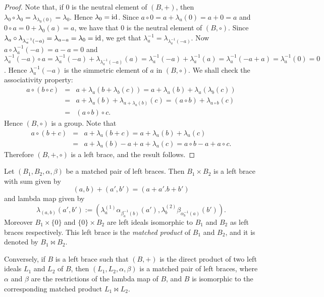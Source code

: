 \begin{proof}
	Note that, if $0$ is the neutral element of $(B,+)$, then $\lambda_0\circ\lambda_0=\lambda_{\lambda_0(0)}=\lambda_0$. Hence
	$\lambda_0=\operatorname{id}$. Since $a\circ 0=a+\lambda_a(0)=a+0=a$ and $0\circ a=0+\lambda_0(a)=a$, we have that $0$ is the neutral element of $(B,\circ)$. Since $\lambda_a\circ\lambda_{\lambda^{-1}_{a}(-a)}=\lambda_{a-a}=\lambda_0=\operatorname{id}$, we get that $\lambda^{-1}_a=\lambda_{\lambda^{-1}_a(-a)}$. Now $a\circ \lambda^{-1}_{a}(-a)=a-a=0$ and $\lambda^{-1}_a(-a)\circ a=\lambda^{-1}_a(-a)+\lambda_{\lambda^{-1}_a(-a)}(a)=\lambda^{-1}_a(-a)+\lambda^{-1}_{a}(a)=\lambda^{-1}_a(-a+a)=\lambda^{-1}_a(0)=0$. Hence $\lambda^{-1}_a(-a)$ is the simmetric element of $a$ in $(B,\circ)$. We shall check the associativity property:
	\begin{eqnarray*}
		a\circ (b\circ c)&=&a+\lambda_a(b+\lambda_b(c))=a+\lambda_a(b)+\lambda_a(\lambda_b(c))\\
		&=&a+\lambda_a(b)+\lambda_{a+\lambda_a(b)}(c)=(a\circ b)+\lambda_{a\circ b}(c)\\
		&=&(a\circ b)\circ c.
	\end{eqnarray*}
Hence $(B,\circ)$ is a group. Note that
\begin{eqnarray*}
	a\circ (b+c)&=&a+\lambda_a(b+c)=a+\lambda_a(b)+\lambda_a(c)\\
	&=&a+\lambda_a(b)-a+a+\lambda_a(c)=a\circ b-a+a\circ c.
\end{eqnarray*}
Therefore $(B,+,\circ)$ is a left brace, and the result follows.
\end{proof}

\begin{theorem}\label{thm:matchedproduct}
	Let $(B_1,B_2,\alpha,\beta)$ be a matched pair of left braces. Then $B_1\times B_2$ is a left brace with sum given by
	$$(a,b)+(a',b')=(a+a'.b+b')$$
and lambda map given by
$$\lambda_{(a,b)}(a',b'):=\left( \lambda^{(1)}_{a}\alpha_{\beta^{-1}_a(b)}(a'), \lambda^{(2)}_{b}\beta_{\alpha^{-1}_b(a)}(b')\right).$$
Moreover $B_1\times \{0\}$ and $\{0\}\times B_2$ are left ideals isomorphic to $B_1$ and $B_2$ as left braces respectively.
This left brace is  the \emph{matched product} of $B_1$ and $B_2$, and it is denoted by $B_1\bowtie B_2$.

Conversely, if $B$ is a left brace such that $(B,+)$ is the direct product of two left ideals $L_1$ and $L_2$ of $B$, then $(L_1,L_2,\alpha,\beta)$ is a matched pair of left braces, where $\alpha$ and $\beta$ are the restrictions of the lambda map of $B$, and $B$  is isomorphic to the corresponding matched product $L_1\bowtie L_2$.   	
\end{theorem}	

